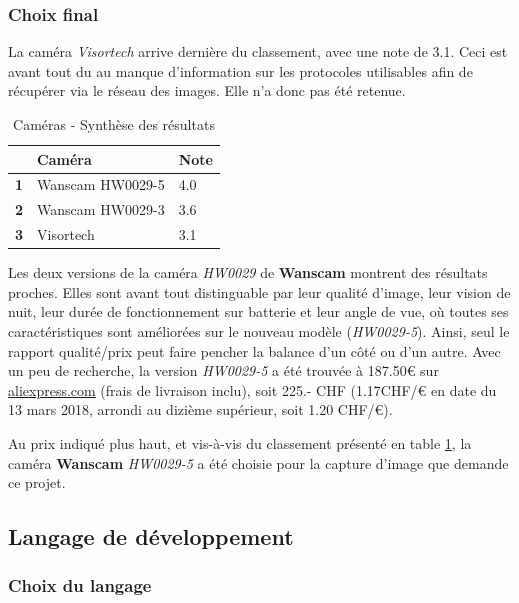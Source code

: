 \subsubsection{Choix final}

La caméra \textit{Visortech} arrive dernière du classement, avec une note de 3.1. Ceci est avant tout du au manque d'information sur les protocoles utilisables afin de récupérer via le réseau des images. Elle n'a donc pas été retenue.

\begin{table}[!ht]
    \centering
    \caption{Caméras - Synthèse des résultats}
    \label{cam:synthese}
    \begin{tabular}{@{}lll@{}}
    \toprule
      & Caméra           & Note \\ \midrule
    \textbf{1} & Wanscam HW0029-5 & 4.0  \\
    \textbf{2} & Wanscam HW0029-3 & 3.6  \\
    \textbf{3} & Visortech        & 3.1  \\ \bottomrule
    \end{tabular}
\end{table}

Les deux versions de la caméra \textit{HW0029} de \textbf{Wanscam} montrent des résultats proches. Elles sont avant tout distinguable par leur qualité d'image, leur vision de nuit, leur durée de fonctionnement sur batterie et leur angle de vue, où toutes ses caractéristiques sont améliorées sur le nouveau modèle (\textit{HW0029-5}). Ainsi, seul le rapport qualité/prix peut faire pencher la balance d'un côté ou d'un autre. Avec un peu de recherche, la version \textit{HW0029-5} a été trouvée à 187.50€ sur \url{aliexpress.com}\autocite{cam:wan5-buy} (frais de livraison inclu), soit 225.- CHF (1.17CHF/€ en date du 13 mars 2018\autocite{util:cours}, arrondi au dizième supérieur, soit 1.20 CHF/€). 

Au prix indiqué plus haut, et vis-à-vis du classement présenté en table \ref{cam:synthese}, la caméra \textbf{Wanscam} \textit{HW0029-5} a été choisie pour la capture d'image que demande ce projet.



\subsection{Langage de développement}
\subsubsection{Choix du langage}

